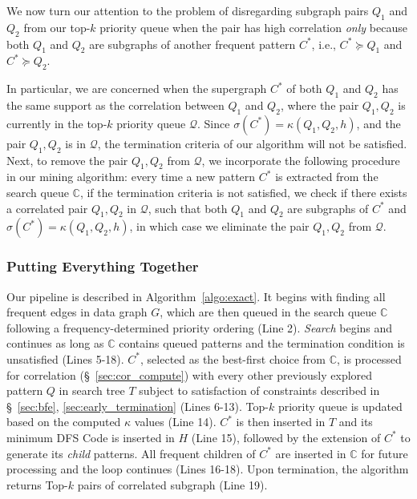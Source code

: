  We now turn our attention to the problem of
disregarding subgraph pairs $Q_1$ and $Q_2$
from our top-$k$ priority queue when the pair has high correlation {\em only} because both $Q_1$ and $Q_2$ are
subgraphs of another frequent pattern $C^*$, i.e., $C^* \succeq Q_1$ and $C^* \succeq Q_2$.

In particular, we are concerned when the supergraph $C^*$ of both $Q_1$ and
$Q_2$ has the same support as the correlation between $Q_1$ and $Q_2$, where the
pair $Q_1,Q_2$ is currently in the top-$k$ priority queue $\mathcal{Q}$. Since
$\sigma(C^*)=\kappa(Q_1,Q_2,h)$, and the pair $Q_1,Q_2$ is in $\mathcal{Q}$, the
termination criteria of our algorithm will not be satisfied. Next, to remove the
pair $Q_1,Q_2$ from $\mathcal{Q}$, we incorporate the following procedure in our
mining algorithm: every time a new pattern $C^*$ is extracted from the search
queue $\mathbb{C}$, if the termination criteria is not satisfied, we check if
there exists a correlated pair $Q_1,Q_2$ in $\mathcal{Q}$, such that both $Q_1$
and $Q_2$ are subgraphs of $C^*$ and $\sigma(C^*)=\kappa(Q_1,Q_2,h)$, in
which case we eliminate the pair $Q_1,Q_2$ from $\mathcal{Q}$.

\subsubsection{Putting Everything Together}
\label{sec:exact_description}
%
Our pipeline is described in Algorithm~\ref{algo:exact}.
It begins with finding all frequent edges in data graph $G$,
which are then queued in the search queue $\mathbb{C}$
following a frequency-determined priority ordering (Line 2).
\textit{Search} begins and continues as long as $\mathbb{C}$ contains queued patterns
and the termination condition is unsatisfied (Lines 5-18).
$C^{*}$, selected as the best-first choice
from $\mathbb{C}$, is processed for correlation (\S~\ref{sec:cor_compute}) with every other
previously explored pattern $Q$ in search tree $T$ subject to satisfaction of
constraints described in \S~\ref{sec:bfe}, \ref{sec:early_termination} (Lines 6-13). Top-$k$ priority queue is updated
based on the computed $\kappa$ values (Line 14). $C^{*}$ is then inserted in $T$ and its
minimum {\sf DFS Code} is inserted in $H$ (Line 15), followed by the extension of $C^{*}$ to generate
its \emph{child} patterns. All frequent children of $C^{*}$ are inserted
in $\mathbb{C}$ for future processing and the loop continues (Lines 16-18).
Upon termination, the algorithm returns Top-$k$ pairs of correlated subgraph (Line 19).
%
